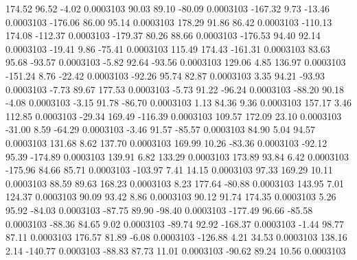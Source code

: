       174.52       96.52       -4.02     0.0003103
       90.03       89.10      -80.09     0.0003103
     -167.32        9.73      -13.46     0.0003103
     -176.06       86.00       95.14     0.0003103
      178.29       91.86       86.42     0.0003103
     -110.13      174.08     -112.37     0.0003103
     -179.37       80.26       88.66     0.0003103
     -176.53       94.40       92.14     0.0003103
      -19.41        9.86      -75.41     0.0003103
      115.49      174.43     -161.31     0.0003103
       83.63       95.68      -93.57     0.0003103
       -5.82       92.64      -93.56     0.0003103
      129.06        4.85      136.97     0.0003103
     -151.24        8.76      -22.42     0.0003103
      -92.26       95.74       82.87     0.0003103
        3.35       94.21      -93.93     0.0003103
       -7.73       89.67      177.53     0.0003103
       -5.73       91.22      -96.24     0.0003103
      -88.20       90.18       -4.08     0.0003103
       -3.15       91.78      -86.70     0.0003103
        1.13       84.36        9.36     0.0003103
      157.17        3.46      112.85     0.0003103
      -29.34      169.49     -116.39     0.0003103
      109.57      172.09       23.10     0.0003103
      -31.00        8.59      -64.29     0.0003103
       -3.46       91.57      -85.57     0.0003103
       84.90        5.04       94.57     0.0003103
      131.68        8.62      137.70     0.0003103
      169.99       10.26      -83.36     0.0003103
      -92.12       95.39     -174.89     0.0003103
      139.91        6.82      133.29     0.0003103
      173.89       93.84        6.42     0.0003103
     -175.96       84.66       85.71     0.0003103
     -103.97        7.41       14.15     0.0003103
       97.33      169.29       10.11     0.0003103
       88.59       89.63      168.23     0.0003103
        8.23      177.64      -80.88     0.0003103
      143.95        7.01      124.37     0.0003103
       90.09       93.42        8.86     0.0003103
       90.12       91.74      174.35     0.0003103
        5.26       95.92      -84.03     0.0003103
      -87.75       89.90      -98.40     0.0003103
     -177.49       96.66      -85.58     0.0003103
      -88.36       84.65        9.02     0.0003103
      -89.74       92.92     -168.37     0.0003103
       -1.44       98.77       87.11     0.0003103
      176.57       81.89       -6.08     0.0003103
     -126.88        4.21       34.53     0.0003103
      138.16        2.14     -140.77     0.0003103
      -88.83       87.73       11.01     0.0003103
      -90.62       89.24       10.56     0.0003103
